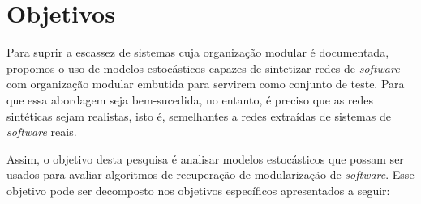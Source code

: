 \documentclass[12pt]{article}
\begin{document}



\section{Objetivos}

Para suprir a escassez de sistemas cuja organização modular é documentada,
propomos o uso de modelos estocásticos capazes de sintetizar redes de
\emph{software} com organização modular embutida para servirem como conjunto de
teste. Para que essa abordagem seja bem-sucedida, no entanto, é preciso que as
redes sintéticas sejam realistas, isto é, semelhantes a redes extraídas de
sistemas de \emph{software} reais. 

Assim, o objetivo desta pesquisa é analisar modelos estocásticos que possam ser
usados para avaliar algoritmos de recuperação de modularização de
\emph{software}. Esse objetivo pode ser decomposto nos objetivos específicos
apresentados a seguir:
\end{document}
